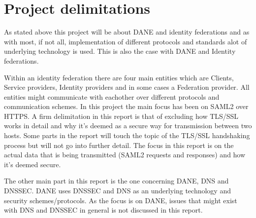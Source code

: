 \section{Project delimitations}
As stated above this project will be about DANE and identity federations and as with most, if not all, implementation of different protocols and standards alot of underlying technology is used.
This is also the case with DANE and Identity federations.

Within an identity federation there are four main entities which are Clients, Service providers, Identity providers and in some cases a Federation provider.
All entities might communicate with eachother over different protocols and communication schemes.
In this project the main focus has been on SAML2 over HTTPS.
A firm delimitation in this report is that of excluding how TLS/SSL works in detail and why it's deemed as a secure way for transmission between two hosts.
Some parts in the report will touch the topic of the TLS/SSL handshaking process but will not go into further detail.
The focus in this report is on the actual data that is being transmitted (SAML2 requests and responses) and how it's deemed secure. 

The other main part in this report is the one concerning DANE, DNS and DNSSEC.
DANE uses DNSSEC and DNS as an underlying technology and security schemes/protocols.
As the focus is on DANE, issues that might exist with DNS and DNSSEC in general is not discussed in this report.





